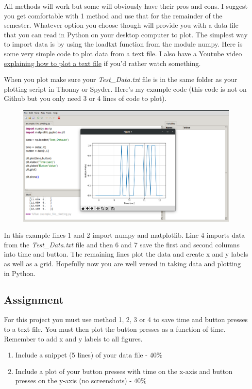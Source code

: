 All methods will work but some will obviously have their pros and
cons. I suggest you get comfortable with 1 method and use that for the
remainder of the semester. Whatever option you choose though will
provide you with a data file that you can read in Python on your
desktop computer to plot. The simplest way to import data is by using
the loadtxt function from the module numpy. Here is some very simple
code to plot data from a text file. I also have a \href{https://www.youtube.com/watch?v=tJOz-ty-2ec&list=PL_D7_GvGz-v1RsDs_OdNW65qRjEjmpfQx&index=12}{Youtube video
explaining how to plot a text file} if you’d rather watch something. 

When you plot make sure your {\it Test\_Data.txt} file is in the same folder
as your plotting script in Thonny or Spyder. Here’s my example code
(this code is not on Github but you only need 3 or 4 lines of code to plot). 
\begin{figure}[H]
  \begin{center}
    \includegraphics[width=\textwidth]{Figures/plotdata.png}
  \end{center}
\end{figure}
In this example lines 1 and 2 import numpy and matplotlib. Line 4
imports data from the {\it Test\_Data.txt} file and then 6 and 7 save the
first and second columns into time and button. The remaining lines
plot the data and create x and y labels as well as a grid. Hopefully
now you are well versed in taking data and plotting in Python.

\subsection{Assignment}

For this project you must use method 1, 2, 3 or 4 to save time and button presses to a text file. You must then plot the button presses as a function of time. Remember to add x and y labels to all figures.



\begin{enumerate}[itemsep=-5pt]
\item Include a snippet (5 lines) of your data file - 40\%
\item Include a plot of your button presses with time on the x-axis and button presses on the y-axis (no screenshots) - 40\%
\end{enumerate}
